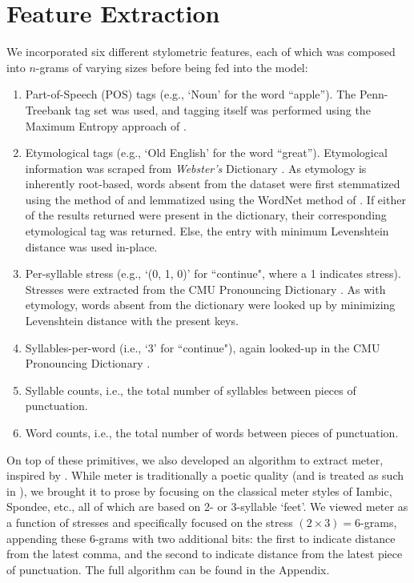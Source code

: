 \documentclass[14pt]{article} %
\theoremstyle{plain}
\theoremstyle{definition}
\theoremstyle{remark}
\begin{document}
\section{Feature Extraction}

We incorporated six different stylometric features, each of which was composed into $n$-grams of varying sizes before being fed into the model:
\begin{enumerate}
\item Part-of-Speech (POS) tags (e.g., `Noun' for the word ``apple''). The Penn-Treebank tag set was used, and tagging itself was performed using the Maximum Entropy approach of \citet{Ratnaparkhi}.
\item Etymological tags (e.g., `Old English' for the word ``great''). Etymological information was scraped from \textit{Webster's} Dictionary \citep{Dictionary}. As etymology is inherently root-based, words absent from the dataset were first stemmatized using the method of \citet{Porter} and lemmatized using the WordNet method of \citet{Fellbaum}. If either of the results returned were present in the dictionary, their corresponding etymological tag was returned. Else, the entry with minimum Levenshtein distance was used in-place.
\item Per-syllable stress (e.g., `(0, 1, 0)' for ``continue", where a 1 indicates stress). Stresses were extracted from the CMU Pronouncing Dictionary \citep{Lenzo}. As with etymology, words absent from the dictionary were looked up by minimizing Levenshtein distance with the present keys.
\item Syllables-per-word (i.e., `3' for ``continue"), again looked-up in the CMU Pronouncing Dictionary \citep{Lenzo}.
\item Syllable counts, i.e., the total number of syllables between pieces of punctuation.
\item Word counts, i.e., the total number of words between pieces of punctuation.
\end{enumerate}

On top of these primitives, we also developed an algorithm to extract meter, inspired by \citet{Genzel}. While meter is traditionally a poetic quality (and is treated as such in \citep{Genzel}), we brought it to prose by focusing on the classical meter styles of Iambic, Spondee, etc., all of which are based on 2- or 3-syllable `feet'. We viewed meter as a function of stresses and specifically focused on the stress $(2\times3)=6$-grams, appending these $6$-grams with two additional bits: the first to indicate distance from the latest comma, and the second to indicate distance from the latest piece of punctuation. The full algorithm can be found in the Appendix.
\end{document}
